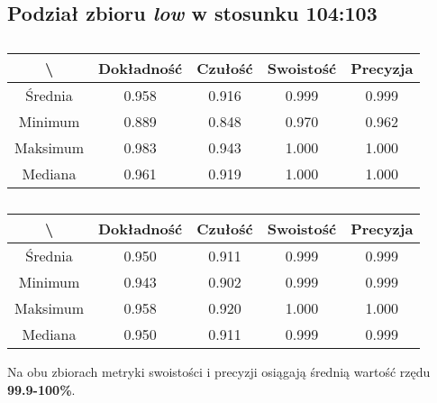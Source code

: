 \subsection{Podział zbioru \textit{low} w stosunku 104:103}
\label{sec:lowsplitd}


\begin{table}[H]
	\centering
	\caption{}
	\vspace{6pt}
	{\footnotesize
		\begin{tabular}{|c|c|c|c|c|}
      \hline \textbackslash & Dokładność & Czułość & Swoistość & Precyzja \\
      \hline Średnia & 0.958 & 0.916 & 0.999 & 0.999 \\
      \hline Minimum & 0.889 & 0.848 & 0.970 & 0.962 \\
      \hline Maksimum & 0.983 & 0.943 & 1.000 & 1.000 \\
      \hline Mediana & 0.961 & 0.919 & 1.000 & 1.000 \\
      \hline
    \end{tabular}
    \label{Tab:lowsplitd_val}
	}
	\vspace{0pt}
\end{table}

\begin{table}[H]
	\centering
	\caption{}
	\vspace{6pt}
	{\footnotesize
		\begin{tabular}{|c|c|c|c|c|}
      \hline \textbackslash & Dokładność & Czułość & Swoistość & Precyzja \\
      \hline Średnia & 0.950 & 0.911 & 0.999 & 0.999 \\
      \hline Minimum & 0.943 & 0.902 & 0.999 & 0.999 \\
      \hline Maksimum & 0.958 & 0.920 & 1.000 & 1.000 \\
      \hline Mediana & 0.950 & 0.911 & 0.999 & 0.999 \\
      \hline
    \end{tabular}
    \label{Tab:lowsplitd_test}
	}
	\vspace{0pt}
\end{table}

Na obu zbiorach metryki swoistości i precyzji osiągają średnią wartość rzędu \textbf{99.9-100\%}.
